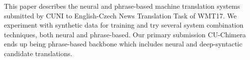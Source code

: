 This paper describes the neural and phrase-based machine translation systems submitted by CUNI to English-Czech News Translation Task of WMT17. We experiment with synthetic data for training and try several system combination techniques, both neural and phrase-based. Our primary submission CU-Chimera ends up being phrase-based backbone which includes neural and deep-syntactic candidate translations.
